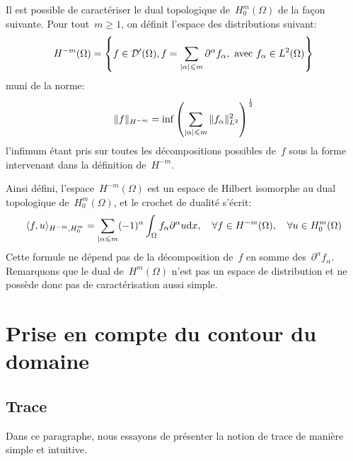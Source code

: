 \medskip
\begin{definition}\label{Th-Hmm}
Il est possible de caractériser le dual topologique de~$H^m_0(\Omega)$ de la façon suivante. Pour tout~$m\ge 1$, on définit l'espace des distributions suivant:
\begin{equation}
H^{-m}(\Omega) =\left\{
f\in \mathcal{D}'(\Omega), f=\displaystyle\sum_{|\alpha|\leqslant m} \partial^\alpha f_\alpha,
\text{ avec } f_\alpha\in L^2(\Omega)
\right\}
\end{equation}
muni de la norme:
\begin{equation}
\|f\|_{H^{-m}} = \inf \left( \displaystyle\sum_{|\alpha|\leqslant m} \|f_\alpha\|^2_{L^2} \right)^{1\over2}
\end{equation}
l'infimum étant pris sur toutes les décompositions possibles de~$f$ sous la forme intervenant dans la définition de~$H^{-m}$.
\end{definition}
\medskipvm
Ainsi défini, l'espace~$H^{-m}(\Omega)$ est un espace de Hilbert isomorphe au dual topologique de~$H^m_0(\Omega)$, et le crochet de dualité s'écrit:
\begin{equation}
\langle f,u\rangle_{H^{-m},H_0^m} = \displaystyle\sum_{|\alpha\leqslant m} (-1)^\alpha \displaystyle\int_\Omega
f_\alpha \partial^\alpha u \text{d} x,
\quad \forall f\in H^{-m}(\Omega),\quad \forall u\in H^m_0(\Omega)
\end{equation}
Cette formule ne dépend pas de la décomposition de~$f$ en somme des~$\partial^\alpha f_\alpha$.
\medskipvm
Remarquons que le dual de~$H^m(\Omega)$ n'est pas un espace de distribution et ne possède donc pas de caractérisation aussi simple.

\medskip
\section{Prise en compte du contour du domaine}

\subsection{Trace}
Dans ce paragraphe, nous essayons de présenter la notion de trace de manière simple et intuitive.

